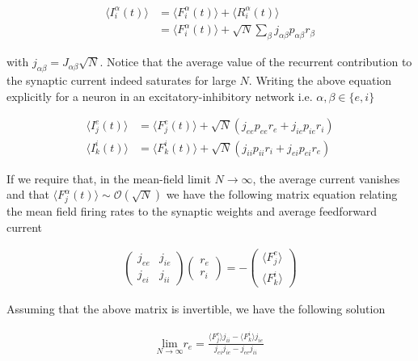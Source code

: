 \documentclass{ucetd}
\begin{document}
\begin{align*}
\langle I_{i}^{\alpha}(t)\rangle &= \langle F_{i}^{\alpha}(t)\rangle + \langle R_{i}^{\alpha}(t)\rangle\\
&= \langle F_{i}^{\alpha}(t)\rangle + \sqrt{N}\sum_{\beta}j_{\alpha\beta}p_{\alpha\beta}r_{\beta}
\end{align*}

with $j_{\alpha\beta} = J_{\alpha\beta}\sqrt{N}$. Notice that the average value of the recurrent contribution to the synaptic current indeed saturates for large $N$. Writing the above equation explicitly for a neuron in an excitatory-inhibitory network i.e. $\alpha, \beta \in \{e, i\}$

\begin{align}
\langle I_{j}^{e}(t)\rangle &= \langle F_{j}^{e}(t)\rangle + \sqrt{N}\left(j_{ee}p_{ee}r_{e} + j_{ie}p_{ie}r_{i}\right)\\
\langle I_{k}^{i}(t)\rangle &= \langle F_{k}^{i}(t)\rangle + \sqrt{N}\left(j_{ii}p_{ii}r_{i} + j_{ei}p_{ei}r_{e}\right)
\end{align}

If we require that, in the mean-field limit $N\rightarrow\infty$, the average current vanishes and that $\langle F_{j}^{\alpha}(t)\rangle \sim \mathcal{O}(\sqrt{N})$ we have the following matrix equation relating the mean field firing rates to the synaptic weights and average feedforward current

\begin{align}
\begin{pmatrix}
j_{ee} & j_{ie}\\
j_{ei} & j_{ii}
\end{pmatrix}
\begin{pmatrix}
r_{e}\\
r_{i}
\end{pmatrix}
= 
-\begin{pmatrix}
\langle F_{j}^{e}\rangle\\
\langle F_{k}^{i}\rangle
\end{pmatrix}
\end{align}

Assuming that the above matrix is invertible, we have the following solution

\begin{align}
\underset{N\rightarrow \infty}{\mathrm{lim}}r_{e} = \frac{\langle F_{j}^{e}\rangle j_{ii}-\langle F_{k}^{i}\rangle j_{ie}}{j_{ei}j_{ie} - j_{ee}j_{ii}}
\end{align}
\end{document}
